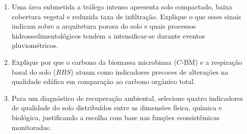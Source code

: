 \documentclass[11pt,a4paper]{article}
\begin{document}
\begin{enumerate}[leftmargin=*, itemsep=6pt]
  \item Uma área submetida a tráfego intenso apresenta solo compactado, baixa cobertura vegetal e reduzida taxa de infiltração. Explique o que esses sinais indicam sobre a arquitetura porosa do solo e quais processos hidrossedimentológicos tendem a intensificar-se durante eventos pluviométricos.

  \item Explique por que o carbono da biomassa microbiana ($C\text{-BM}$) e a respiração basal do solo ($RBS$) atuam como indicadores precoces de alterações na qualidade edáfica em comparação ao carbono orgânico total.

  \item Para um diagnóstico de recuperação ambiental, selecione quatro indicadores de qualidade do solo distribuídos entre as dimensões física, química e biológica, justificando a escolha com base nas funções ecossistêmicas monitoradas.
\end{enumerate}
\end{document}
